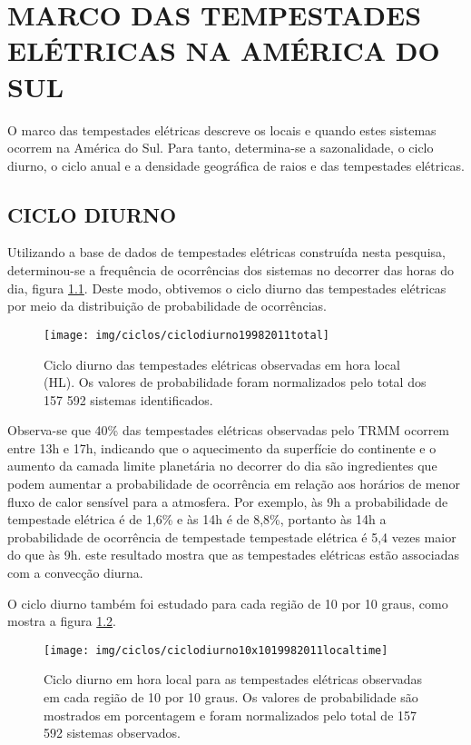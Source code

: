 \chapter{MARCO DAS TEMPESTADES ELÉTRICAS NA AMÉRICA DO SUL}

O marco das tempestades elétricas descreve os locais e quando estes sistemas ocorrem na América do Sul. Para tanto, determina-se a sazonalidade, o ciclo diurno, o ciclo anual e a densidade geográfica de raios e das tempestades elétricas.

\section{CICLO DIURNO}

Utilizando a base de dados de tempestades elétricas construída nesta pesquisa, determinou-se a frequência de ocorrências dos sistemas no decorrer das horas do dia, figura \ref{ciclodiurnototal}. Deste modo, obtivemos o ciclo diurno das tempestades elétricas por meio da distribuição de probabilidade de ocorrências.

\begin{figure}[!hb]
  \centering
  {{\texttt{[image: img/ciclos/ciclodiurno19982011total]}}}
\caption{Ciclo diurno das tempestades elétricas observadas em hora local (HL). Os valores de probabilidade foram normalizados pelo total dos {157 592} sistemas identificados.}
\label{ciclodiurnototal}
\end{figure} 

Observa-se que 40\%  das tempestades elétricas observadas pelo TRMM ocorrem entre 13h e 17h, indicando que o aquecimento da superfície do continente e o aumento da camada limite planetária no decorrer do dia são ingredientes que podem aumentar a probabilidade de ocorrência em  relação aos horários de menor fluxo de calor sensível para a atmosfera. Por exemplo, às 9h a probabilidade de tempestade elétrica é de 1,6\% e às 14h é de 8,8\%, portanto às 14h a probabilidade de ocorrência de tempestade tempestade elétrica é 5,4 vezes maior do que às 9h. este resultado mostra que as tempestades elétricas estão associadas com a convecção diurna.


O ciclo diurno também foi estudado para cada região de 10 por 10 graus, como mostra a figura \ref{diurno}. 

\begin{figure}[!hb]
\centering
{\texttt{[image: img/ciclos/ciclodiurno10x1019982011localtime]}}  
\caption{Ciclo diurno em hora local para as tempestades elétricas observadas em cada região de 10 por 10 graus. Os valores de probabilidade são mostrados em porcentagem e foram normalizados pelo total de {157 592} sistemas observados.}
\label{diurno}
\end{figure}

